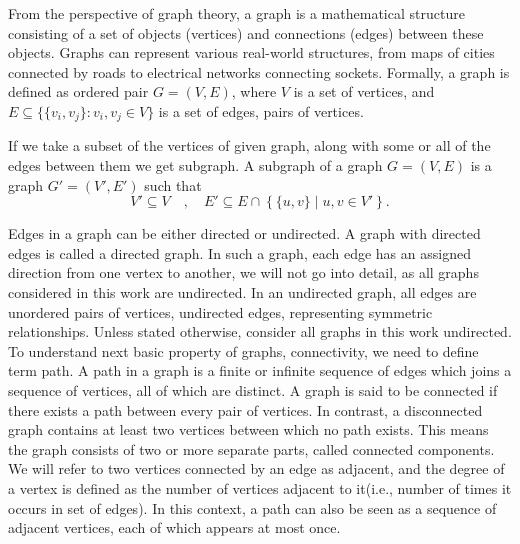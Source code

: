 \documentclass[openany]{book}
\begin{document}
	From the perspective of graph theory, a graph is a mathematical structure consisting of a set of objects (vertices) and connections (edges) between these objects.
	Graphs can represent various real-world structures, from maps of cities connected by roads to electrical networks connecting sockets.
	Formally, a graph is defined as ordered pair \( G = (V, E) \), where \( V \) is a set of vertices, and \( E \subseteq \{\{v_i, v_j\} : v_i, v_j \in V\} \) is a set of edges, pairs of vertices.
	
	If we take a subset of the vertices of given graph, along with some or all of the edges between them we get subgraph. A subgraph of a graph \( G = (V, E) \) is a graph \( G' = (V', E') \) such that  
	\[
	V' \subseteq V \quad, \quad E' \subseteq E \cap \left\{ \{u,v\} \mid u,v \in V' \right\}.
	\]
	
	Edges in a graph can be either directed or undirected. A graph with directed edges is called a directed graph. In such a graph, each edge has an assigned direction from one vertex to another, we will not go into detail, as all graphs considered in this work are undirected. In an undirected graph, all edges are unordered pairs of vertices, undirected edges, representing symmetric relationships. Unless stated otherwise, consider all graphs in this work undirected.
	To understand next basic property of graphs, connectivity, we need to define term path. A path in a graph is a finite or infinite sequence of edges which joins a sequence of vertices, all of which are distinct. A graph is said to be connected if there exists a path between every pair of vertices. In contrast, a disconnected graph contains at least two vertices between which no path exists. This means the graph consists of two or more separate parts, called connected components. 
	We will refer to two vertices connected by an edge as adjacent, and the degree of a vertex is defined as the number of vertices adjacent to it(i.e., number of times it occurs in set of edges). In this context, a path can also be seen as a sequence of adjacent vertices, each of which appears at most once.
	
\end{document}
